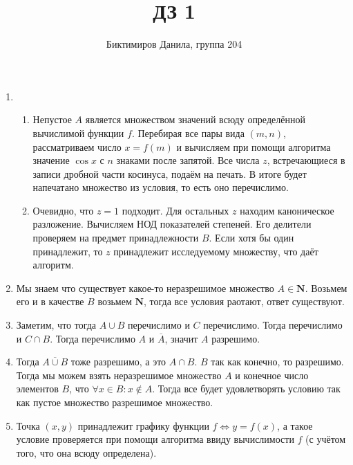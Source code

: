 \documentclass[11pt]{article}
\begin{document}
	
	\author{Биктимиров Данила, группа 204}
	\title{ДЗ 1}
	\date{}
	\maketitle
	
	\medskip
	
	\begin{enumerate}
		
		\item  \begin{enumerate}
			\item Непустое $A$ является множеством значений всюду определённой вычислимой функции $f$. Перебирая все пары вида $(m,n)$, рассматриваем число $x=f(m)$ и вычисляем при помощи алгоритма значение $\cos x$ с $n$ знаками после запятой. Все числа $z$, встречающиеся в записи дробной части косинуса, подаём на печать. В итоге будет напечатано множество из условия, то есть оно перечислимо.
			\item Очевидно, что $z=1$ подходит. Для остальных $z$ находим каноническое разложение. Вычисляем НОД показателей степеней. Его делители проверяем на предмет принадлежности $B$. Если хотя бы один принадлежит, то $z$ принадлежит исследуемому множеству, что даёт алгоритм.
			
	\end{enumerate}
		
		
		\item Мы знаем что существует какое-то неразрешимое множество $A\in \mathbf{N}$. Возьмем его и в качестве $B$ возьмем $\mathbf{N}$, тогда все условия раотают, ответ существуют.
		
		\item Заметим, что тогда $A\cup B$ перечислимо и $C$ перечислимо. Тогда перечислимо и $C \cap B$. Тогда перечислимо $A$ и $\overline{A}$, значит $A$ разрешимо.
		
		\item Тогда $\overline{A\cup B} $ тоже разрешимо, а это $A\cap B$. $B$ так как конечно, то разрешимо. Тогда мы можем взять неразрешимое множество $A$ и конечное число элементов $B$, что $\forall x \in B : x \notin A $. Тогда все будет удовлетворять условию так как пустое множество разрешимое множество.
		
		\item Точка $(x,y)$ принадлежит графику функции $f \Leftrightarrow y=f(x)$, а такое условие проверяется при помощи алгоритма ввиду вычислимости $f$ (с учётом того, что она всюду определена).
		

\end{enumerate}
\end{document}
